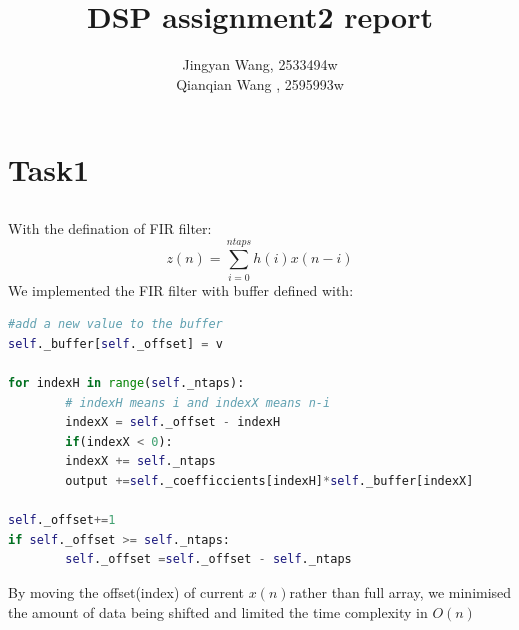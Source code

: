 \documentclass[a4paper,12pt]{article}
\begin{document}
%
   \title{\textbf{DSP assignment2 report}}

   \author{Jingyan Wang, 2533494w \\ Qianqian Wang , 2595993w}
          
   \date{}

   \maketitle
   
   \tableofcontents
 
  \newpage

\section{Task1}
\subsection{}
With the defination of FIR filter:
$$
z(n) = \sum_{i=0}^{ntaps}h(i)x(n-i)
$$
We implemented the FIR filter with buffer defined with:
\begin{lstlisting}[language=Python]
#add a new value to the buffer
self._buffer[self._offset] = v

for indexH in range(self._ntaps):
		# indexH means i and indexX means n-i
		indexX = self._offset - indexH
		if(indexX < 0):
		indexX += self._ntaps     
		output +=self._coefficcients[indexH]*self._buffer[indexX]

self._offset+=1
if self._offset >= self._ntaps:
		self._offset =self._offset - self._ntaps
\end{lstlisting}
By moving the offset(index) of current $x(n)$rather than full array, we minimised the amount of data being shifted and limited the time complexity in $O(n)$
\end{document}

